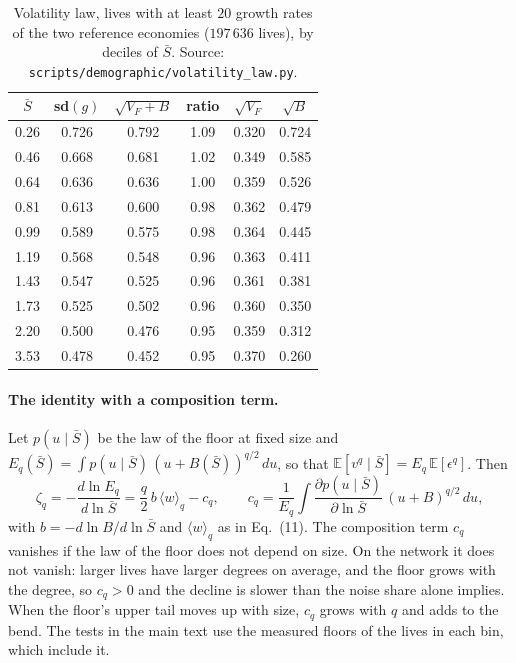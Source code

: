 \documentclass[pre,onecolumn,superscriptaddress,nofootinbib]{revtex4-2}
\newcommand{\E}{\mathbb E}
\newcommand{\Sb}{\bar S}
\begin{document}
\begin{table}[h]
\caption{Volatility law, lives with at least $20$ growth rates of the two reference economies
($197\,636$ lives), by deciles of $\Sb$.  Source: \texttt{scripts/demographic/volatility\_law.py}.}
\label{tab:law}
\begin{ruledtabular}
\begin{tabular}{cccccc}
$\Sb$ & sd$(g)$ & $\sqrt{V_F+B}$ & ratio & $\sqrt{V_F}$ & $\sqrt B$\\
\hline
0.26 & 0.726 & 0.792 & 1.09 & 0.320 & 0.724\\
0.46 & 0.668 & 0.681 & 1.02 & 0.349 & 0.585\\
0.64 & 0.636 & 0.636 & 1.00 & 0.359 & 0.526\\
0.81 & 0.613 & 0.600 & 0.98 & 0.362 & 0.479\\
0.99 & 0.589 & 0.575 & 0.98 & 0.364 & 0.445\\
1.19 & 0.568 & 0.548 & 0.96 & 0.363 & 0.411\\
1.43 & 0.547 & 0.525 & 0.96 & 0.361 & 0.381\\
1.73 & 0.525 & 0.502 & 0.96 & 0.360 & 0.350\\
2.20 & 0.500 & 0.476 & 0.95 & 0.359 & 0.312\\
3.53 & 0.478 & 0.452 & 0.95 & 0.370 & 0.260\\
\end{tabular}
\end{ruledtabular}
\end{table}

\paragraph{The identity with a composition term.}  Let $p(u\mid\Sb)$ be the law of the floor at fixed
size and $E_q(\Sb)=\int p(u\mid\Sb)\,(u+B(\Sb))^{q/2}\,du$, so that $\E[v^q\mid\Sb]=E_q\,\E[\epsilon^q]$.  Then
\begin{equation}
\zeta_q=-\frac{d\ln E_q}{d\ln\Sb}=\frac q2\,b\,\langle w\rangle_q-c_q,\qquad
c_q=\frac{1}{E_q}\int\frac{\partial p(u\mid\Sb)}{\partial\ln\Sb}\,(u+B)^{q/2}\,du ,
\label{eq:identity}
\end{equation}
with $b=-d\ln B/d\ln\Sb$ and $\langle w\rangle_q$ as in Eq.~(11).  The composition term $c_q$ vanishes if the
law of the floor does not depend on size.  On the network it does not vanish: larger lives have
larger degrees on average, and the floor grows with the degree, so $c_q>0$ and the decline is slower
than the noise share alone implies.  When the floor's upper tail moves up with size, $c_q$ grows with $q$ and
adds to the bend.  The tests in the main text use the measured floors of the lives in
each bin, which include it.
\end{document}
